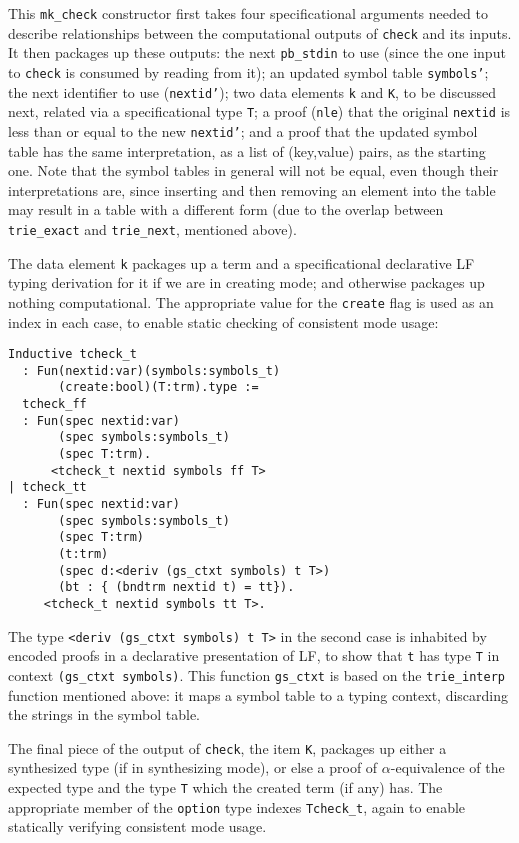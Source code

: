 \documentclass[preprint,natbib]{sigplanconf}
\begin{document}
\noindent This \texttt{mk\_check} constructor first takes four
specificational arguments needed to describe relationships between the
computational outputs of \texttt{check} and its inputs.  It then
packages up these outputs: the next \texttt{pb\_stdin} to use (since
the one input to \texttt{check} is consumed by reading from it); an
updated symbol table \texttt{symbols'}; the next identifier to use
(\texttt{nextid'}); two data elements \texttt{k} and \texttt{K}, to be
discussed next, related via a specificational type \texttt{T}; a proof
(\texttt{nle}) that the original \texttt{nextid} is less than or equal
to the new \texttt{nextid'}; and a proof that the updated symbol table
has the same interpretation, as a list of (key,value) pairs, as the
starting one.  Note that the symbol tables in general will not be
equal, even though their interpretations are, since inserting and then
removing an element into the table may result in a table with a
different form (due to the overlap between \texttt{trie\_exact} and
\texttt{trie\_next}, mentioned above).

The data element \texttt{k} packages up a term and a specificational
declarative LF typing derivation for it if we are in creating mode;
and otherwise packages up nothing computational.  The appropriate
value for the \texttt{create} flag is used as an index in each case,
to enable static checking of consistent mode usage:

\begin{verbatim}
Inductive tcheck_t
  : Fun(nextid:var)(symbols:symbols_t)
       (create:bool)(T:trm).type :=
  tcheck_ff
  : Fun(spec nextid:var)
       (spec symbols:symbols_t)
       (spec T:trm).
      <tcheck_t nextid symbols ff T>
| tcheck_tt
  : Fun(spec nextid:var)
       (spec symbols:symbols_t)
       (spec T:trm)
       (t:trm)
       (spec d:<deriv (gs_ctxt symbols) t T>)
       (bt : { (bndtrm nextid t) = tt}).
     <tcheck_t nextid symbols tt T>.
\end{verbatim}

\noindent The type \texttt{<deriv (gs\_ctxt symbols) t T>} in the
second case is inhabited by encoded proofs in a declarative
presentation of LF, to show that \texttt{t} has type \texttt{T} in
context \texttt{(gs\_ctxt symbols)}.  This function \texttt{gs\_ctxt}
is based on the \texttt{trie\_interp} function mentioned above: it
maps a symbol table to a typing context, discarding the strings in the
symbol table.

The final piece of the output of \texttt{check}, the item \texttt{K},
packages up either a synthesized type (if in synthesizing mode), or
else a proof of $\alpha$-equivalence of the expected type and the type
\texttt{T} which the created term (if any) has.  The appropriate
member of the \texttt{option} type indexes \texttt{Tcheck\_t}, again
to enable statically verifying consistent mode usage.
\end{document}
